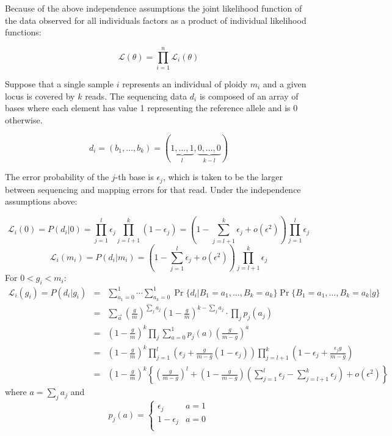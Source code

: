 Because of the above independence assumptions the joint likelihood function of the data observed for all individuals factors as a product of individual likelihood functions:

\begin{equation}
    \mathcal{L}(\theta)=\prod_{i=1}^n\mathcal{L}_i(\theta)
\end{equation}

Suppose that a single sample $i$ represents an individual of ploidy $m_i$ and a given locus is covered by $k$ reads. The sequencing data $d_i$ is composed of an array of bases where each element has value 1 representing the reference allele and is 0 otherwise. 

\[
d_i=(b_1,\dots,b_k)=(\underbrace{1,\ldots,1}_l,\underbrace{0,\ldots,0}_{k-l})
\]


The error probability of the $j$-th base is $\epsilon_j$, which is taken to be the larger between sequencing and mapping errors for that read. Under the independence assumptions above:

\begin{equation}
    \mathcal{L}_i(0) = P(d_i|0)=\prod_{j=1}^l\epsilon_j\prod_{j=l+1}^k(1-\epsilon_j)=\left(1-\sum_{j=l+1}^k\epsilon_j+o(\epsilon^2)\right)\prod_{j=1}^l\epsilon_j
\end{equation}
\begin{equation}
    \mathcal{L}_i(m_i) = P(d_i|m_i)=\left(1-\sum_{j=1}^l\epsilon_j+o(\epsilon^2)\right)\prod_{j=l+1}^k\epsilon_j
\end{equation}
For $0<g_i<m_i$:
\begin{eqnarray*}\label{eq:gd}
    \mathcal{L}_i(g_i) = P(d_i|g_i)&=&\sum_{a_1=0}^1\cdots\sum_{a_k=0}^1\Pr\{d_i|B_1=a_1,\ldots,B_k=a_k\}\Pr\{B_1=a_1,\ldots,B_k=a_k|g\}\\\nonumber
    &=&\sum_{\vec{a}}\left(\frac{g}{m}\right)^{\sum_j a_j}\left(1-\frac{g}{m}\right)^{k-\sum_j a_j}\cdot\prod_j p_j(a_j)\\\nonumber
    &=&\left(1-\frac{g}{m}\right)^k\prod_j\sum_{a=0}^1 p_j(a)\left(\frac{g}{m-g}\right)^a\\\nonumber
    &=&\left(1-\frac{g}{m}\right)^k\prod_{j=1}^l\left(\epsilon_j+\frac{g}{m-g}(1-\epsilon_j)\right)\prod_{j=l+1}^k\left(1-\epsilon_j+\frac{\epsilon_jg}{m-g}\right)\\\nonumber
    &=&\left(1-\frac{g}{m}\right)^k\left\{\left(\frac{g}{m-g}\right)^l+\left(1-\frac{g}{m-g}\right)\left(\sum_{j=1}^l\epsilon_j-\sum_{j=l+1}^k\epsilon_j\right)+o(\epsilon^2)\right\}
\end{eqnarray*}
where $a=\sum_j a_j$ and
$$
    p_j(a)=\left\{\begin{array}{ll}
    \epsilon_j & \mbox{$a=1$}\\
    1-\epsilon_j & \mbox{$a=0$}\\
    \end{array}\right.
$$

